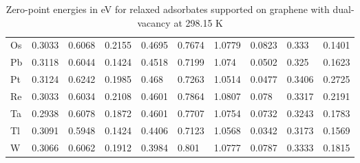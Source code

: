 \begin{table}[h]
{\begin{tabular}{*{10}{l}}
      Os & 0.3033 & 0.6068 & 0.2155 & 0.4695 & 0.7674 & 1.0779 & 0.0823 & 0.333  & 0.1401 \\
      Pb & 0.3118 & 0.6044 & 0.1424 & 0.4518 & 0.7199 & 1.074  & 0.0502 & 0.325  & 0.1623 \\
      Pt & 0.3124 & 0.6242 & 0.1985 & 0.468  & 0.7263 & 1.0514 & 0.0477 & 0.3406 & 0.2725 \\
      Re & 0.3033 & 0.6034 & 0.2108 & 0.4601 & 0.7864 & 1.0807 & 0.078  & 0.3317 & 0.2191 \\
      Ta & 0.2938 & 0.6078 & 0.1872 & 0.4601 & 0.7707 & 1.0754 & 0.0732 & 0.3243 & 0.1783 \\
      Tl & 0.3091 & 0.5948 & 0.1424 & 0.4406 & 0.7123 & 1.0568 & 0.0342 & 0.3173 & 0.1569 \\
      W  & 0.3066 & 0.6062 & 0.1912 & 0.3984 & 0.801  & 1.0777 & 0.0787 & 0.3333 & 0.1815 \\
      \hline
  \end{tabular}
  }
  \caption{Zero-point energies in eV for relaxed adsorbates supported on graphene with dual-vacancy at 298.15 K}
  \label{si_table11}
\end{table}


